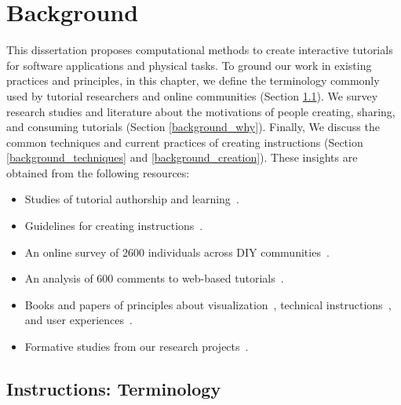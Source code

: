 
\chapter{Background}
\label{chapter_background}

This dissertation proposes computational methods to create interactive tutorials for software applications and physical tasks. To ground our work in existing practices and principles, in this chapter, we define the terminology commonly used by tutorial researchers and online communities (Section \ref{background_terms}).
%
We survey research studies and literature about the motivations of people creating, sharing, and consuming tutorials (Section \ref{background_why}). Finally, We discuss the common techniques and current practices of creating instructions (Section \ref{background_techniques} and \ref{background_creation}).
%
These insights are obtained from the following resources:
\begin{itemize}
  \item Studies of tutorial authorship and learning~\cite{Torrey:2007he,Torrey:2009fc,Wakkary:2015:TAH:2702123.2702550,Black:1986:KMI:29933.275623,Tseng:2014:PVP:2598510.2598540}.
  \item Guidelines for creating instructions~\cite{InstructableHowTo,wikiHowHowTo}.
  \item An online survey of 2600 individuals across DIY communities~\cite{Kuznetsov:2010:REA:1868914.1868950}.
  \item An analysis of 600 comments to web-based tutorials~\cite{BenLafreniere:2013ux}.
  \item Books and papers of principles about visualization~\cite{tufte1990envisioning,cutting_representing_2002,Agrawala:2011:DPV:1924421.1924439}, technical instructions~\cite{mijksenaar1999open,Smith03iimanufacturer}, and user experiences~\cite{greenberg2012sketching,Buxton:2007:SUE:1526229}.
  \item Formative studies from our research projects~\cite{Chi:2012:MAG:2380116.2380130,Chi:2014:DRS:2556288.2557254,Chi:2013:DGC:2501988.2502052,Chi:2016:DemoDraw}.
\end{itemize}


\section{Instructions: Terminology}
\label{background_terms}

